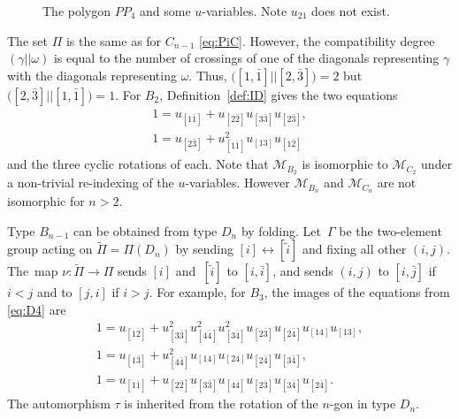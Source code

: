 \documentclass[10pt,a4paper]{amsart}
\def\M{{\mathcal{M}}}
\def\tPi{{\tilde \Pi}}
\numberwithin{equation}{section}
\begin{document}
\begin{figure}
\centering
{}
\caption{The polygon $PP_4$ and some $u$-variables. Note $u_{21}$ does not exist.}\label{d4}
\end{figure}

\medskip{} %
The set $\Pi$ is the same as for $C_{n-1}$ \eqref{eq:PiC}. However, the compatibility degree $(\gamma||\omega)$ is equal to the number of crossings of one of the diagonals representing $\gamma$ with the diagonals representing $\omega$. Thus, $\big([1, \bar 1]||[2, \bar 3]\big) =2$ but $\big([2,\bar 3] || [1,\bar 1]\big) = 1$. For $B_2$, Definition~\ref{def:ID} gives the two equations
\begin{gather*}
1 = u_{[1 \bar 1]} + u_{[2 \bar 2]} u_{[3 \bar 3]} u_{[2 \bar 3]},
\\
1 = u_{[2 \bar 3]} + u_{[1 \bar 1]}^2 u_{[13]} u_{[1 \bar 2]}
\end{gather*}
and the three cyclic rotations of each. Note that $\M_{B_2}$ is isomorphic to $\M_{C_2}$ under a non-trivial re-indexing of the $u$-variables. However $\M_{B_n}$ and $\M_{C_n}$ are not isomorphic for $n >2$.

Type $B_{n-1}$ can be obtained from type $D_n$ by folding. Let~$\Gamma$ be the two-element group acting on $\tPi = \Pi(D_n)$ by sending $[i] \leftrightarrow [\tilde i]$ and fixing all other $(i,j)$. The~map $\nu\colon \tPi \to \Pi$ sends $[i]$ and~$[\tilde i]$ to $[i,\bar i]$, and sends $(i,j)$ to $[i, \bar j]$ if $i < j$ and to $[j, i]$ if $ i > j$. For example, for $B_3$, the images of the equations from \eqref{eq:D4} are
\begin{gather}
1 = u_{[1 \bar 2]} + u_{[3\bar 3]}^2 u_{[4 \bar 4]}^2 u_{[3 \bar 4]}^2 u_{[2 \bar 3]} u_{[2 \bar 4]} u_{[14]} u_{[13]},\nonumber
\\
1 =u_{[1 \bar 3]} + u_{[4 \bar 4]}^2 u_{[1 4]}u_{[2 4]} u_{[2 \bar4]} u_{[3 \bar 4]},\nonumber
\\
1 = u_{[1\bar 1]}+ u_{[2\bar 2]} u_{[3 \bar 3]} u_{[4 \bar 4]} u_{[2 \bar 3]} u_{[3 \bar 4]} u_{[2 \bar 4]}.
\label{eq:B3}
\end{gather}
The automorphism $\tau$ is inherited from the rotation of the $n$-gon in type $D_n$.
\end{document}
